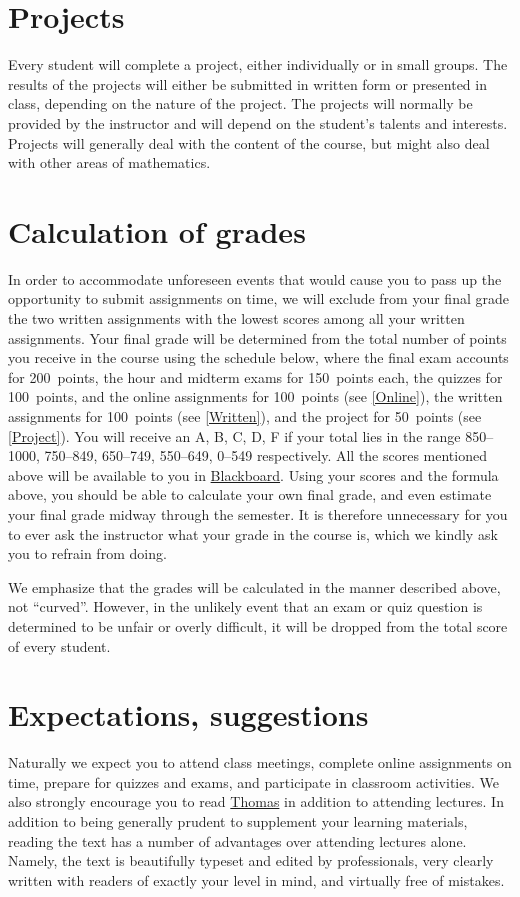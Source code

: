 \documentclass[11pt]{article}
\begin{document}
\section{Projects}\label{Project}
Every student will complete a project, either individually
or in small groups. The results of the projects
will either be submitted in written form or presented
in class, depending on the nature of the project.
The projects will normally be provided by the instructor
and will depend on the student's
talents and interests. Projects will generally deal with the content of the course,
but might also deal with other areas of mathematics.

\section{Calculation of grades}\label{Assessment}
In order to accommodate unforeseen events that would cause you
to pass up the opportunity to submit assignments on time,
we will exclude from your final grade
the two written assignments with the lowest scores among
all your written assignments.
Your final grade will be determined from the total
number of points you receive in the course using the schedule below,
where the final exam accounts for 200~points,
the hour and midterm exams for 150~points each,
the quizzes for 100~points,
and the online assignments for 100~points (see \autoref{Online}),
the written assignments for 100~points (see \autoref{Written}),
and the project for 50~points (see \autoref{Project}).
You will receive an A, B, C, D, F if your total lies in the range
850--1000, 750--849, 650--749, 550--649, 0--549 respectively.
All the scores mentioned above will be available to you in
\href{https://bb.its.iastate.edu}{Blackboard}. Using your scores
and the formula above, you should be able to calculate your own final grade,
and even estimate your final grade midway through the semester.
It is therefore unnecessary for you to ever ask the instructor
what your grade in the course is, which we kindly ask you to refrain from
doing.

We emphasize that the grades will be calculated in the manner described
above, not ``curved''.
However, in the unlikely event that an exam or quiz question is determined
to be unfair or overly difficult, it will be dropped from the total score of
every student.

\section{Expectations, suggestions} Naturally we expect you to attend 
class meetings, complete online assignments on 
time, prepare for quizzes and exams, and participate in classroom 
activities. We also strongly encourage you to read
\href{http://wps.aw.com/aw_thomas_calculus_series}{Thomas}
in addition to attending lectures.
In addition to being generally prudent to 
supplement your learning materials, reading the text has a number of 
advantages over attending lectures alone. Namely, the text is beautifully 
typeset and edited by professionals, very clearly written with readers 
of exactly your level in mind, and virtually free of mistakes.
\end{document}
